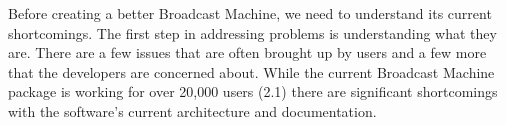 \documentclass[a4paper,12pt]{report}
\begin{document}
	


	Before creating a better Broadcast Machine, we need to understand its current shortcomings. The first step in addressing problems is understanding what they are. There are a few issues that are often brought up by users and a few more that the developers are concerned about. While the current Broadcast Machine package is working for over 20,000 users (2.1) there are significant shortcomings with the software's current architecture and documentation.
\end{document}
